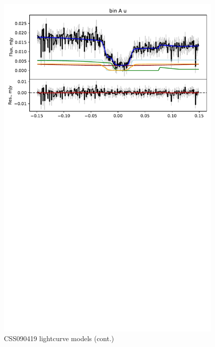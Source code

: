 \begin{figure}
    \centering
    \includegraphics[width=\textwidth]{figures/results/CSS090419/CSS090419_2.pdf}
    \caption{CSS090419 lightcurve models (cont.)}
    \label{fig:CSS090419 all lightcurves cont 1}
\end{figure}
